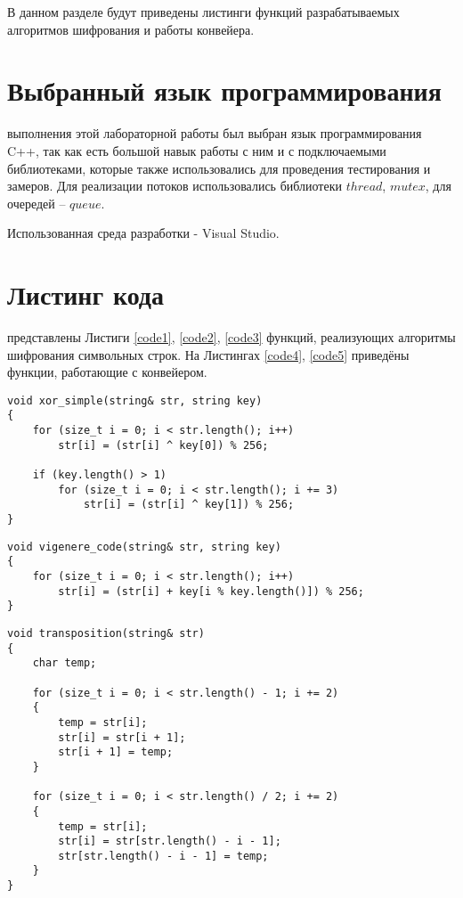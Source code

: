 В данном разделе будут приведены листинги функций разрабатываемых алгоритмов шифрования и работы конвейера.

\section{Выбранный язык программирования}
 выполнения этой лабораторной работы был выбран язык программирования C++, так как есть большой навык работы с ним и с подключаемыми библиотеками, которые также использовались для проведения тестирования и замеров. Для реализации потоков использовались библиотеки $thread$, $mutex$, для очередей -- $queue$. \cite{thread} \cite{mutex} \cite{queue}

Использованная среда разработки - Visual Studio. \cite{Visual}

\section{Листинг кода}
 представлены Листиги \ref{code1}, \ref{code2}, \ref{code3} функций, реализующих алгоритмы шифрования символьных строк. На Листингах \ref{code4}, \ref{code5} приведёны функции, работающие с конвейером. 

\begin{lstlisting}[label=code1, caption = Алгоритм c использованием операции XOR]
void xor_simple(string& str, string key)
{
	for (size_t i = 0; i < str.length(); i++)
		str[i] = (str[i] ^ key[0]) % 256;
	
	if (key.length() > 1)
		for (size_t i = 0; i < str.length(); i += 3)
			str[i] = (str[i] ^ key[1]) % 256;
}
\end{lstlisting}


\begin{lstlisting}[label=code2, caption = Шифр Виженера]
void vigenere_code(string& str, string key)
{
	for (size_t i = 0; i < str.length(); i++)
		str[i] = (str[i] + key[i % key.length()]) % 256;
}
\end{lstlisting}


\begin{lstlisting}[label=code3, caption = Транспозиция]
void transposition(string& str)
{
	char temp;
	
	for (size_t i = 0; i < str.length() - 1; i += 2)
	{
		temp = str[i];
		str[i] = str[i + 1];
		str[i + 1] = temp;
	}
	
	for (size_t i = 0; i < str.length() / 2; i += 2)
	{
		temp = str[i];
		str[i] = str[str.length() - i - 1];
		str[str.length() - i - 1] = temp;
	}
}
\end{lstlisting}


